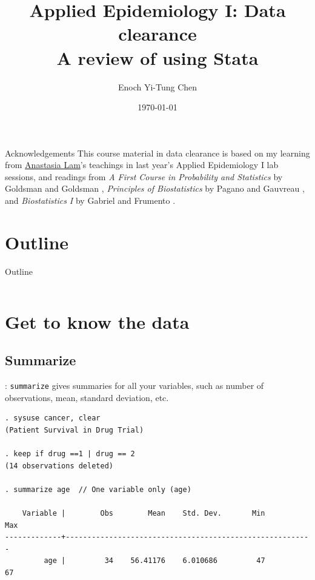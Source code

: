 \documentclass{beamer}
\title[Applied Epi I: Data Management]{Applied Epidemiology I: Data clearance\\ A review of using Stata}
\date{\today}
\author[Enoch Yi-Tung Chen]{Enoch Yi-Tung Chen}
\institute[MEB]{Department of Medical Epidemiology and Biostatistics, Karolinska Insitutet}
\begin{document}
\begin{frame}
\maketitle 
\end{frame}

\begin{frame}{Acknowledgements}
This course material in data clearance is based on my learning from \href{https://staff.ki.se/people/analam}{Anastasia Lam}'s teachings in last year's Applied Epidemiology I lab sessions, and readings from \textit{A First Course in Probability and Statistics} by Goldsman and Goldsman \cite{Goldsman2020}, \textit{Principles of Biostatistics} by Pagano and Gauvreau \cite{Pagano2000}, and \textit{Biostatistics I} by Gabriel and Frumento \cite{Gabriel2020}.

\end{frame}

\section*{Outline}
\begin{frame}{Outline}
 \begin{columns}[t]
        \begin{column}{.5\textwidth}
            \tableofcontents[sections={2-3}]
        \end{column}
        \begin{column}{.5\textwidth}
            \tableofcontents[sections={4}]
        \end{column}
\end{columns}
\end{frame}

\section{Get to know the data}
\subsection{Summarize}
\begin{frame}[fragile]{\secname : \subsecname}
\verb|summarize| gives summaries for all your variables, such as number of observations, mean, standard deviation, etc. \\[4mm]
\small
\begin{verbatim}
. sysuse cancer, clear
(Patient Survival in Drug Trial)

. keep if drug ==1 | drug == 2
(14 observations deleted)

. summarize age  // One variable only (age)

    Variable |        Obs        Mean    Std. Dev.       Min        Max
-------------+---------------------------------------------------------
         age |         34    56.41176    6.010686         47         67

	
\end{verbatim}

\end{frame}
\end{document}
